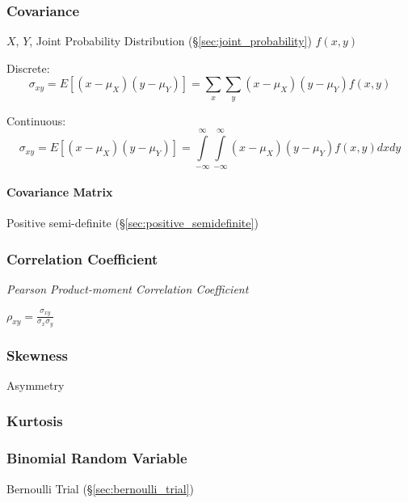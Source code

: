 \subsubsection{Covariance}\label{sec:covariance}

$X$, $Y$, Joint Probability Distribution
(\S\ref{sec:joint_probability}) $f(x,y)$

Discrete:
\[
  \sigma_{xy} = E [(x - \mu_X)(y - \mu_Y)] = \sum_x \sum_y (x - \mu_X)
  (y - \mu_Y) f(x,y)
\]

Continuous:
\[
  \sigma_{xy} = E [(x - \mu_X)(y - \mu_Y)] =
  \int\limits_{-\infty}^{\infty} \int\limits_{-\infty}^{\infty}
  (x - \mu_X) (y - \mu_Y) f(x,y) dx dy
\]



\paragraph{Covariance Matrix}\label{sec:covariance_matrix}\hfill

Positive semi-definite (\S\ref{sec:positive_semidefinite})



\subsubsection{Correlation Coefficient}
\label{sec:correlation_coefficient}

\emph{Pearson Product-moment Correlation Coefficient}

$\rho_{xy} = \frac{\sigma_{xy}}{\sigma_x \sigma_y}$



\subsubsection{Skewness}\label{sec:skewness}

Asymmetry %



\subsubsection{Kurtosis}\label{sec:kurtosis}

\subsubsection{Binomial Random Variable}
\label{sec:binomial_random_variable}

Bernoulli Trial (\S\ref{sec:bernoulli_trial})

